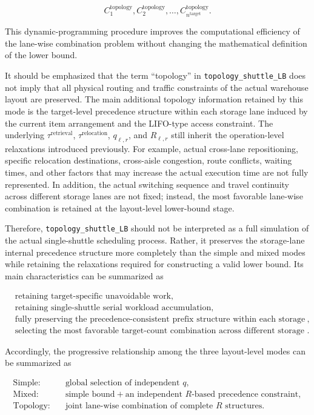 \[
C_1^{\mathrm{topology}},
C_2^{\mathrm{topology}},
\ldots,
C_{n^{\mathrm{target}}}^{\mathrm{topology}}.
\]

This dynamic-programming procedure improves the computational efficiency of the
lane-wise combination problem without changing the mathematical definition of
the lower bound.

It should be emphasized that the term ``topology'' in
\texttt{topology\_shuttle\_LB} does not imply that all physical routing and
traffic constraints of the actual warehouse layout are preserved. The main
additional topology information retained by this mode is the target-level
precedence structure within each storage lane induced by the current item
arrangement and the LIFO-type access constraint. The underlying
\(\tau^{\mathrm{retrieval}}\), \(\tau^{\mathrm{relocation}}\),
\(q_{\ell,r}\), and \(R_{\ell,r}\) still inherit the operation-level
relaxations introduced previously. For example, actual cross-lane
repositioning, specific relocation destinations, cross-aisle congestion, route
conflicts, waiting times, and other factors that may increase the actual
execution time are not fully represented. In addition, the actual switching
sequence and travel continuity across different storage lanes are not fixed;
instead, the most favorable lane-wise combination is retained at the
layout-level lower-bound stage.

Therefore, \texttt{topology\_shuttle\_LB} should not be interpreted as a full
simulation of the actual single-shuttle scheduling process. Rather, it preserves
the storage-lane internal precedence structure more completely than the simple
and mixed modes while retaining the relaxations required for constructing a
valid lower bound. Its main characteristics can be summarized as

\[
\begin{aligned}
&\text{retaining target-specific unavoidable work},\\
&\text{retaining single-shuttle serial workload accumulation},\\
&\text{fully preserving the precedence-consistent prefix structure within each storage lane},\\
&\text{selecting the most favorable target-count combination across different storage lanes}.
\end{aligned}
\]

Accordingly, the progressive relationship among the three layout-level modes
can be summarized as

\[
\begin{aligned}
\text{Simple:}\quad&
\text{global selection of independent } q,\\
\text{Mixed:}\quad&
\text{simple bound}
+
\text{an independent } R\text{-based precedence constraint},\\
\text{Topology:}\quad&
\text{joint lane-wise combination of complete } R\text{ structures}.
\end{aligned}
\]

